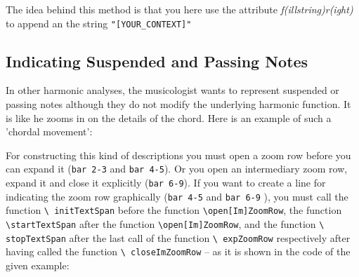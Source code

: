 \documentclass[
  DIV=calc,
  BCOR=5mm,
  12pt,
  headings=small,
  oneside,
  abstract=true,
  toc=bib,
  xcolor=dvipsnames,
  openany,
  ngerman,english]{scrartcl}
\newcommand{\acc}[0]{\textit}
\begin{document}
The idea behind this method is that you here use the attribute
\acc{f(illstring)r(ight)} to append an the string \texttt{"[YOUR\_CONTEXT]"} 

\subsection{Indicating Suspended and Passing Notes}

In other harmonic analyses, the musicologist wants to represent suspended or
passing notes although they do not modify the underlying harmonic function. It
is like he zooms in on the details of the chord. Here is an example of such a
'chordal movement':

\begin{center}
\end{center}

For constructing this kind of descriptions you must open a zoom row before you
can expand it (\texttt{bar 2-3} and \texttt{bar 4-5}). Or you open an
intermediary zoom row, expand it and close it explicitly (\texttt{bar 6-9}). If
you want to create a line for indicating the zoom row graphically (\texttt{bar
4-5} and \texttt{bar 6-9} ), you must call the function \texttt{\textbackslash
initTextSpan} before the function \texttt{\textbackslash open[Im]ZoomRow}, the
function \texttt{\textbackslash startTextSpan} after the function
\texttt{\textbackslash open[Im]ZoomRow}, and the function \texttt{\textbackslash
stopTextSpan} after the last call of the function \texttt{\textbackslash
expZoomRow} respectively after having called the function \texttt{\textbackslash
closeImZoomRow} -- as it is shown in the code of the given example:
\end{document}
